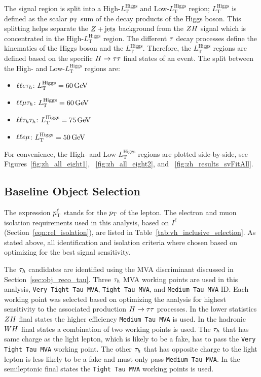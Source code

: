 The signal region is split into a High-$L_{\text{T}}^{\textrm{Higgs}}$ and Low-$L_{\text{T}}^{\textrm{Higgs}}$
region; $L_{\text{T}}^{\textrm{Higgs}}$ is defined as the scalar $p_\mathrm{T}$ sum of the decay 
products of the Higgs boson. This splitting helps separate the $Z+\text{jets}$
background from the $ZH$ signal which is concentrated in the
High-$L_{\text{T}}^{\textrm{Higgs}}$ region.
The different $\tau$ decay processes define the kinematics of the Higgs boson and
the $L_{\text{T}}^{\textrm{Higgs}}$. Therefore, the $L_{\text{T}}^{\textrm{Higgs}}$
regions are defined based on the specific $H\to\tau\tau$ final states of an event. 
The split between the High- and Low-$L_{\text{T}}^{\textrm{Higgs}}$
regions are:
\begin{itemize}
\item $\ell\ell e\tau_{h}$: $L_{\text{T}}^{\textrm{Higgs}} = 60\,\mathrm{GeV}$
\item $\ell\ell\mu\tau_{h}$: $L_{\text{T}}^{\textrm{Higgs}} = 60\,\mathrm{GeV}$
\item $\ell\ell\tau_{h}\tau_{h}$: $L_{\text{T}}^{\textrm{Higgs}} = 75\,\mathrm{GeV}$
\item $\ell\ell e\mu$: $L_{\text{T}}^{\textrm{Higgs}} = 50\,\mathrm{GeV}$
\end{itemize}
For convenience, the High- and Low-$L_{\text{T}}^{\textrm{Higgs}}$ regions are plotted
side-by-side, see Figures~\ref{fig:zh_all_eight1}, ~\ref{fig:zh_all_eight2}, 
and ~\ref{fig:zh_results_svFitAll}.



\subsection{Baseline Object Selection}
\label{sec:vh_obj_selection}

The expression $p_\mathrm{T}^{\ell}$ stands for the $p_\mathrm{T}$ of the lepton. The electron and muon isolation 
requirements used in this analysis, based on $I^{\ell}$ (Section~\ref{eqn:rel_isolation}), 
are listed in Table~\ref{tab:vh_inclusive_selection}. As stated above, all 
identification and isolation criteria where chosen based on optimizing for the best signal sensitivity.

The $\tau_{h}$ candidates are identified using the MVA discriminant discussed in
Section~\ref{sec:obj_reco_tau}.
Three $\tau_{h}$ MVA working points are used in this analysis,
\texttt{Very Tight Tau MVA}, \texttt{Tight Tau MVA}, and \texttt{Medium Tau MVA} ID. Each working point was selected based on
optimizing the analysis for highest sensitivity to the associated production
$H\to\tau\tau$ processes. In the lower statistics $ZH$ final states the higher
efficiency \texttt{Medium Tau MVA} is used. In the hadronic $WH$ final states
a combination of two working points is used. The 
$\tau_{h}$ that has same charge as the light lepton, which 
is likely to be a fake, has to pass the \texttt{Very Tight Tau MVA} working 
point. The other $\tau_{h}$ that has opposite charge to the light lepton
is less likely to be a fake and must only pass \texttt{Medium Tau MVA}.
In the semileptonic final states the \texttt{Tight Tau MVA} working points
is used.

